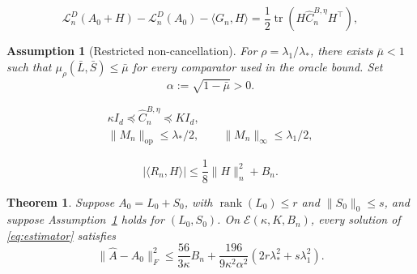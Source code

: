 \documentclass[10pt,a4paper]{amsart}
\newtheorem{assumption}{Assumption}
\newtheorem{theorem}{Theorem}
\DeclareMathOperator{\rank}{rank}
\DeclareMathOperator{\tr}{tr}
\begin{document}
	\begin{equation}
		\mathcal L_n^D(A_0+H)-\mathcal L_n^D(A_0)-\langle G_n,H\rangle=\frac{1}{2} \tr\!\left(H\widehat C_n^{B,\eta}H^\top\right), \label{eq:exactexpansion} \end{equation}

	\begin{assumption}[Restricted non-cancellation]\label{ass:angle}
		For $\rho=\lambda_1/\lambda_*$, there exists $\bar\mu<1$ such that $\mu_\rho(\bar L,\bar S)\le\bar\mu$ for every comparator used in the oracle bound. Set 
		\begin{equation}
			\alpha:=\sqrt{1-\bar\mu}>0. \label{eq:alpha}
		\end{equation}
	\end{assumption}

		\begin{align}
			\kappa I_d\preceq\widehat C_n^{B,\eta}\preceq K I_d,\label{eq:curvature_event}\\
			\|M_n\|_{\mathrm{op}}\le\lambda_*/2,\qquad \|M_n\|_\infty\le\lambda_1/2,\label{eq:score_event}
		\end{align}

		\begin{equation}
			|\langle R_n,H\rangle|\le\frac18\|H\|_n^2+B_n.\label{eq:remainder_event}
		\end{equation}

	\begin{theorem}\label{thm:det_exact}
		Suppose $A_0=L_0+S_0$, with $\rank(L_0)\le r$ and $\|S_0\|_0\le s$, and suppose Assumption~\ref{ass:angle} holds for $(L_0,S_0)$. On $\mathcal E(\kappa,K,B_n)$, every solution of \eqref{eq:estimator} satisfies
		\begin{equation}
			\|\widehat A-A_0\|_F^2 	\le \frac{56}{3\kappa}B_n
			+\frac{196}{9\kappa^2\alpha^2} \left(2r\lambda_*^2+s\lambda_1^2\right).
			\label{eq:det_exact}
		\end{equation}
	\end{theorem}
\end{document}
